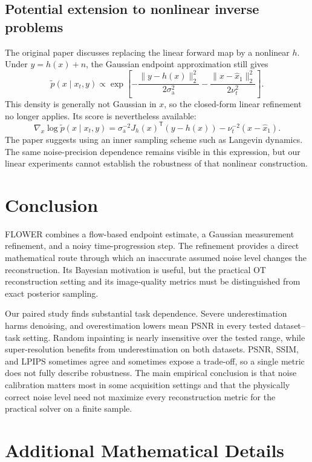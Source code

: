 \documentclass[10pt,letterpaper]{article}
\newcommand{\sa}{\sigma_{\mathrm a}}
\newcommand{\xhat}{\widehat{x}_1}
\begin{document}
\subsection{Potential extension to nonlinear inverse problems}
The original paper discusses replacing the linear forward map by a nonlinear $h$. Under $y=h(x)+n$, the Gaussian endpoint approximation still gives
\begin{equation}
 \widetilde p(x\mid x_t,y)\propto
 \exp\!\left[-\frac{\|y-h(x)\|_2^2}{2\sa^2}
             -\frac{\|x-\xhat\|_2^2}{2\nu_t^2}\right].
\end{equation}
This density is generally not Gaussian in $x$, so the closed-form linear refinement no longer applies. Its score is nevertheless available:
\begin{equation}
 \nabla_x\log\widetilde p(x\mid x_t,y)
 =\sa^{-2}J_h(x)^\mathsf{T}(y-h(x))-\nu_t^{-2}(x-\xhat).
\end{equation}
The paper suggests using an inner sampling scheme such as Langevin dynamics. The same noise-precision dependence remains visible in this expression, but our linear experiments cannot establish the robustness of that nonlinear construction.

\section{Conclusion}
FLOWER combines a flow-based endpoint estimate, a Gaussian measurement refinement, and a noisy time-progression step. The refinement provides a direct mathematical route through which an inaccurate assumed noise level changes the reconstruction. Its Bayesian motivation is useful, but the practical OT reconstruction setting and its image-quality metrics must be distinguished from exact posterior sampling.

Our paired study finds substantial task dependence. Severe underestimation harms denoising, and overestimation lowers mean PSNR in every tested dataset--task setting. Random inpainting is nearly insensitive over the tested range, while super-resolution benefits from underestimation on both datasets. PSNR, SSIM, and LPIPS sometimes agree and sometimes expose a trade-off, so a single metric does not fully describe robustness. The main empirical conclusion is that noise calibration matters most in some acquisition settings and that the physically correct noise level need not maximize every reconstruction metric for the practical solver on a finite sample.

\appendix
\section{Additional Mathematical Details}\label{app:variance}
\end{document}
